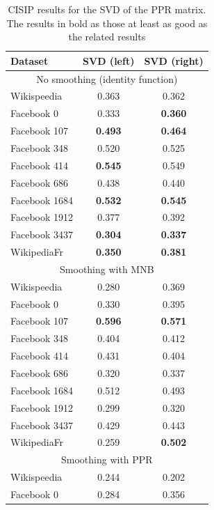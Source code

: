 \begin{table}[t]
\caption[CISIP results for the SVD of the PPR matrix]{CISIP results for the SVD of the PPR matrix. The results in bold as those at least as good as the related \parfaite results}
\begin{center}
\begin{tabular}{l|c|c}
\hline
\textbf{Dataset} & \textbf{SVD (left)} & \textbf{SVD (right)}\\
\hline
\multicolumn{3}{c}{No smoothing (identity function)}\\
\hline
Wikispeedia  & 0.363 & 0.362\\
Facebook 0 & 0.333 & \textbf{0.360}\\
Facebook 107 & \textbf{0.493} & \textbf{0.464}\\
Facebook 348 & 0.520 & 0.525\\
Facebook 414 & \textbf{0.545} & 0.549\\
Facebook 686 & 0.438 & 0.440\\
Facebook 1684 & \textbf{0.532} & \textbf{0.545}\\
Facebook 1912 & 0.377 & 0.392\\
Facebook 3437 & \textbf{0.304} & \textbf{0.337}\\
WikipediaFr  & \textbf{0.350} & \textbf{0.381}\\
\hline
\multicolumn{3}{c}{Smoothing with MNB}\\
\hline
Wikispeedia  & 0.280 & 0.369\\
Facebook 0 & 0.330 & 0.395\\
Facebook 107 & \textbf{0.596} & \textbf{0.571}\\
Facebook 348 & 0.404 & 0.412\\
Facebook 414 & 0.431 & 0.404\\
Facebook 686 & 0.320 & 0.337\\
Facebook 1684 & 0.512 & 0.493\\
Facebook 1912 & 0.299 & 0.320\\
Facebook 3437 & 0.429 & 0.443\\
WikipediaFr  & 0.259 & \textbf{0.502}\\
\hline
\multicolumn{3}{c}{Smoothing with PPR}\\
\hline
Wikispeedia  & 0.244 & 0.202\\
Facebook 0 & 0.284 & 0.356\\

\end{tabular}
\end{center}
\end{table}
